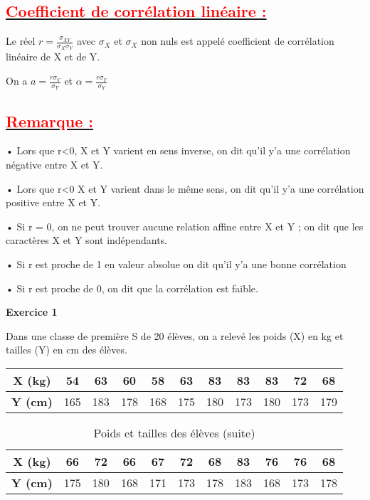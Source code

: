 \documentclass[12pt]{article}
\begin{document}
\subsection*{\underline{\textbf{\textcolor{red}{Coefficient de corrélation linéaire :}}}}
Le réel $r =\frac{\sigma_{XY}}{\sigma_{X}\sigma_{Y}}$ avec $\sigma_{X}$ et $\sigma_{X}$ non nuls est appelé coefficient de corrélation linéaire de X et de Y.

On a  $a=\frac{r\sigma_{Y}}{\sigma_{Y}}$ et $\alpha=\frac{r\sigma_{Y}}{\sigma_{Y}}$
\subsection*{\underline{\textbf{\textcolor{red}{Remarque :}}}}
•	Lors que r<0, X et Y varient en sens inverse, on dit qu’il y’a une corrélation négative entre X et Y.

•	Lors que r<0 X et Y varient dans le même sens, on dit qu’il y’a une corrélation positive entre X et Y.

•	Si r = 0, on ne peut trouver aucune relation affine entre X et Y ; on dit que les caractères X et Y sont indépendants.

•	Si r est proche de 1 en valeur absolue on dit qu’il y’a une bonne corrélation

•	Si r est proche de 0, on dit que la corrélation est faible.

\textbf{Exercice 1}

Dans une classe de première S de 20 élèves, on a relevé les poids (X) en kg et tailles (Y) en cm des élèves.

\begin{table}[h]
\begin{tabular}{|c|c|c|c|c|c|c|c|c|c|c|}
\hline
\textbf{X (kg)} & 54 & 63 & 60 & 58 & 63 & 83 & 83 & 83 & 72 & 68 \\ 
\hline
\textbf{Y (cm)} & 165 & 183 & 178 & 168 & 175 & 180 & 173 & 180 & 173 & 179 \\ 
\hline
\end{tabular}
\end{table}

\begin{table}[h]
\centering
\caption{Poids et tailles des élèves (suite)}
\begin{tabular}{|c|c|c|c|c|c|c|c|c|c|c|}
\hline
\textbf{X (kg)} & 66 & 72 & 66 & 67 & 72 & 68 & 83 & 76 & 76 & 68 \\ 
\hline
\textbf{Y (cm)} & 175 & 180 & 168 & 171 & 173 & 178 & 183 & 168 & 173 & 178 \\ 
\hline
\end{tabular}
\end{table}
\end{document}
